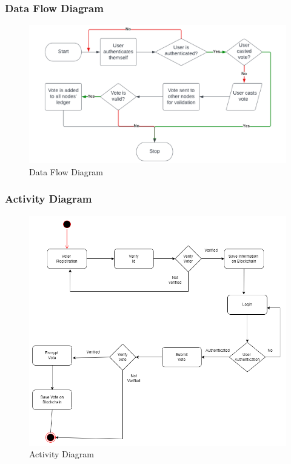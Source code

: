\documentclass[oneside, 12pt]{book}
\begin{document}
			\subsubsection{Data Flow Diagram}
				\begin{figure}[H]
					\centering
					\includegraphics[width=\linewidth]{./Resources/data-flow.png}
				    \caption{Data Flow Diagram}
				    \label{fig:data-flow}
				\end{figure}
			\subsubsection{Activity Diagram}
				\begin{figure}[H]
					\centering
					\includegraphics[width=\linewidth]{./Resources/activity.png}
				    \caption{Activity Diagram}
				    \label{fig:activity}
				\end{figure}
\end{document}
